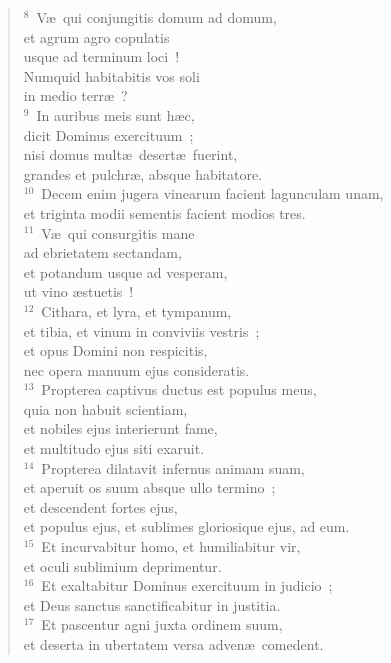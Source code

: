 \begin{verse}${}^{8}$~V\ae\ qui conjungitis domum ad domum,\\ et agrum agro copulatis\\ usque ad terminum loci~!\\ Numquid habitabitis vos soli\\ in medio terr\ae~?\\
${}^{9}$~In auribus meis sunt h\ae c,\\ dicit Dominus exercituum~;\\ nisi domus mult\ae\ desert\ae\ fuerint,\\ grandes et pulchr\ae , absque habitatore.\\
${}^{10}$~Decem enim jugera vinearum facient lagunculam unam,\\ et triginta modii sementis facient modios tres.\\
${}^{11}$~V\ae\ qui consurgitis mane\\ ad ebrietatem sectandam,\\ et potandum usque ad vesperam,\\ ut vino \ae stuetis~!\\
${}^{12}$~Cithara, et lyra, et tympanum,\\ et tibia, et vinum in conviviis vestris~;\\ et opus Domini non respicitis,\\ nec opera manuum ejus consideratis.\\
${}^{13}$~Propterea captivus ductus est populus meus,\\ quia non habuit scientiam,\\ et nobiles ejus interierunt fame,\\ et multitudo ejus siti exaruit.\\
${}^{14}$~Propterea dilatavit infernus animam suam,\\ et aperuit os suum absque ullo termino~;\\ et descendent fortes ejus,\\ et populus ejus, et sublimes gloriosique ejus, ad eum.\\
${}^{15}$~Et incurvabitur homo, et humiliabitur vir,\\ et oculi sublimium deprimentur.\\
${}^{16}$~Et exaltabitur Dominus exercituum in judicio~;\\ et Deus sanctus sanctificabitur in justitia.\\
${}^{17}$~Et pascentur agni juxta ordinem suum,\\ et deserta in ubertatem versa adven\ae\ comedent.\end{verse}


